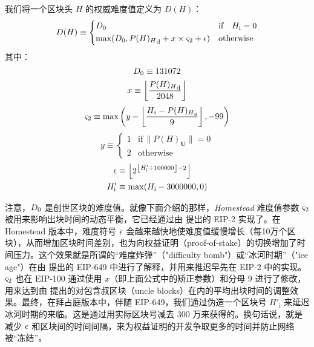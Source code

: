 \documentclass[9pt,oneside]{amsart}
\makeatletter
\newcommand{\linkdest}[1]{\Hy@raisedlink{\hypertarget{#1}{}}}
\makeatother
\begin{document}
\begin{multicols}{2}
\hypertarget{block_difficulty_H__d}{}\linkdest{H__d}我们将一个区块头 $H$ 的权威难度值定义为 $D(H)$：
\begin{equation}
D(H) \equiv \begin{dcases}
D_0 & \text{if} \quad H_{\mathrm{i}} = 0\\
\text{max}\!\left(D_0, {P(H)_{H}}_{\mathrm{d}} + x\times\varsigma_2 + \epsilon \right) & \text{otherwise}\\
\end{dcases}
\end{equation}
其中：
\begin{equation}
D_0 \equiv 131072
\end{equation}
\begin{equation}
x \equiv \left\lfloor\frac{{P(H)_{H}}_{\mathrm{d}}}{2048}\right\rfloor
\end{equation}
\begin{equation}
\varsigma_2 \equiv \text{max}\left( y - \left\lfloor\frac{H_{\mathrm{s}} - {P(H)_{H}}_{\mathrm{s}}}{9}\right\rfloor, -99 \right)
\end{equation}
\begin{equation*}
y \equiv \begin{cases}
1 & \text{if} \, \lVert P(H)_{\mathbf{U}}\rVert = 0 \\
2 & \text{otherwise}
\end{cases}
\end{equation*}
\begin{align}
\epsilon &\equiv \left\lfloor 2^{ \left\lfloor H'_{\mathrm{i}} \div 100000 \right\rfloor - 2 } \right\rfloor \\
H'_{\mathrm{i}} &\equiv \max(H_{\mathrm{i}} - 3000000, 0)
\end{align}

注意，$D_0$ 是创世区块的难度值。就像下面介绍的那样，\textit{Homestead} 难度值参数 $\varsigma_2$ 被用来影响出块时间的动态平衡，它已经通过由 \cite{EIP-2} 提出的 EIP-2 实现了。在 Homestead 版本中，难度符号 $\epsilon$ 会越来越快地使难度值缓慢增长（每10万个区块），从而增加区块时间差别，也为向权益证明（proof-of-stake）的切换增加了时间压力。这个效果就是所谓的“难度炸弹”（"difficulty bomb"）或“冰河时期”（"ice age"）在由 \cite{EIP-649} 提出的 EIP-649 中进行了解释，并用来推迟早先在 EIP-2 中的实现。$\varsigma_2$ 也在 EIP-100 通过使用 $x$（即上面公式中的矫正参数）和分母 9 进行了修改，用来达到由 \cite{EIP-100} 提出的对包含叔区块（uncle blocks）在内的平均出块时间的调整效果。最终，在拜占庭版本中，伴随 EIP-649，我们通过伪造一个区块号 $H'_{\mathrm{i}}$ 来延迟冰河时期的来临。这是通过用实际区块号减去 300 万来获得的。换句话说，就是减少 $\epsilon$ 和区块间的时间间隔，来为权益证明的开发争取更多的时间并防止网络被“冻结”。


\end{multicols}
\end{document}

